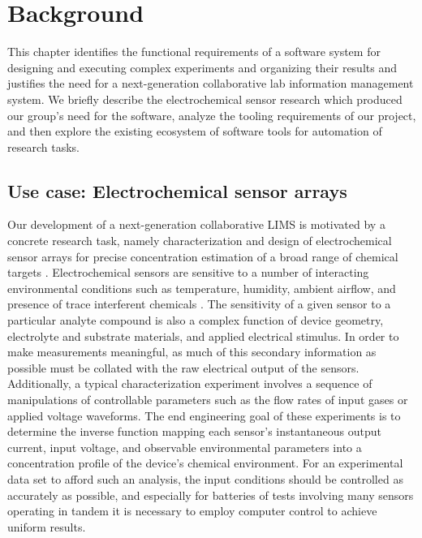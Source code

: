 \documentclass[../thesis]{subfiles}
\begin{document}
\chapter{Background}

This chapter identifies the functional requirements of a software
system for designing and executing complex experiments and organizing
their results and justifies the need for a next-generation
collaborative lab information management system. We briefly describe
the electrochemical sensor research which produced our group's need
for the software, analyze the tooling requirements of our project, and
then explore the existing ecosystem of software tools for automation
of research tasks.



\section{Use case: Electrochemical sensor arrays}

Our development of a next-generation collaborative \gls{LIMS} is motivated
by a concrete research task, namely characterization and design of
electrochemical sensor arrays for precise concentration estimation of
a broad range of chemical targets \cite{Li2014, Wang2016,
  Wang2014}. Electrochemical sensors are sensitive to a number of
interacting environmental conditions such as temperature, humidity,
ambient airflow, and presence of trace interferent chemicals
\cite{Marco2012}. The sensitivity of a given sensor to a particular analyte compound is also
a complex function of device geometry, electrolyte and substrate
materials, and applied electrical stimulus. In order to make
measurements meaningful, as much of this secondary information as
possible must be collated with the raw electrical output of the
sensors. Additionally, a typical characterization experiment involves
a sequence of manipulations of controllable parameters such as the
flow rates of input gases or applied voltage waveforms. The end
engineering goal of these experiments is to determine the inverse
function mapping each sensor's instantaneous output current, input
voltage, and observable environmental parameters into a concentration
profile of the device's chemical environment. For an experimental data
set to afford such an analysis, the input conditions should be
controlled as accurately as possible, and especially for batteries of
tests involving many sensors operating in tandem it is necessary to
employ computer control to achieve uniform results.
\end{document}
